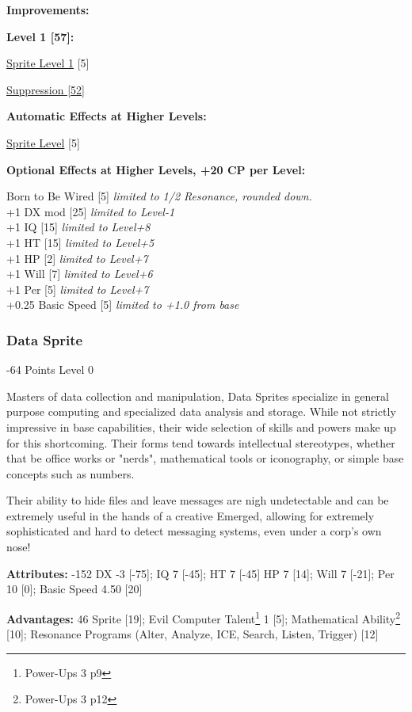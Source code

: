 \begin{multicols*}{3}
\textbf{ Improvements:}

\textbf{Level 1 [57]:}

\hyperref[sprite_level]{Sprite Level 1} [5]

\hyperref[suppression]{Suppression [52]}

\textbf{Automatic Effects at Higher Levels:}

\hyperref[sprite_level]{Sprite Level} [5]

\textbf{Optional Effects at Higher Levels, +20 CP per Level:}

Born to Be Wired [5] \textit{limited to 1/2 Resonance, rounded down.}\\
+1 DX mod [25] \textit{limited to Level-1}\\
+1 IQ [15] \textit{limited to Level+8}\\
+1 HT [15] \textit{limited to Level+5}\\
+1 HP [2] \textit{limited to Level+7}\\
+1 Will [7] \textit{limited to Level+6}\\
+1 Per [5] \textit{limited to Level+7}\\
+0.25 Basic Speed [5] \textit{limited to +1.0 from base}\\

\subsubsection{Data Sprite}
\begin{flushright}
	-64 Points Level 0
\end{flushright}

Masters of data collection and manipulation, Data Sprites specialize in general purpose computing and specialized data analysis and storage. While not strictly impressive in base capabilities, their wide selection of skills and powers make up for this shortcoming. Their forms tend towards intellectual stereotypes, whether that be office works or "nerds", mathematical tools or iconography, or simple base concepts such as numbers.

Their ability to hide files and leave messages are nigh undetectable and can be extremely useful in the hands of a creative Emerged, allowing for extremely sophisticated and hard to detect messaging systems, even under a corp's own nose!

\textbf{Attributes:} -152
DX -3 [-75]; IQ 7 [-45]; HT 7 [-45]
HP 7 [14]; Will 7 [-21]; Per 10 [0]; Basic Speed 4.50 [20]

\textbf{Advantages:} 46
Sprite [19]; Evil Computer Talent\footnote{Power-Ups 3 p9} 1 [5]; Mathematical Ability\footnote{Power-Ups 3 p12} [10]; Resonance Programs (Alter, Analyze, ICE, Search, Listen, Trigger) [12]


\end{multicols*}
